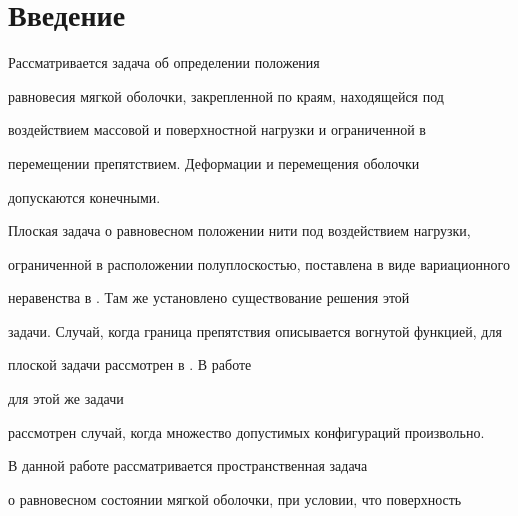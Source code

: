 \date{}




\pagestyle{plain} %







\maketitle


\label{begin}








\section*{Введение}





Рассматривается задача об определении положения


равновесия мягкой оболочки, закрепленной по краям, находящейся под 


воздействием массовой и поверхностной нагрузки и ограниченной в 


перемещении препятствием. Деформации и перемещения оболочки 


допускаются конечными.





Плоская задача о равновесном положении нити под воздействием нагрузки,  


ограниченной в расположении полуплоскостью, поставлена в виде вариационного


неравенства в \cite{BS_86}. Там же установлено существование решения этой


задачи. Случай, когда граница препятствия описывается вогнутой функцией, для


плоской задачи рассмотрен в \cite{BZB_2001_2}. В работе 


\cite{BBZ_2002_1} для этой же задачи


рассмотрен случай, когда множество допустимых конфигураций произвольно.





В данной работе рассматривается пространственная задача


о равновесном состоянии мягкой оболочки, при условии, что поверхность


